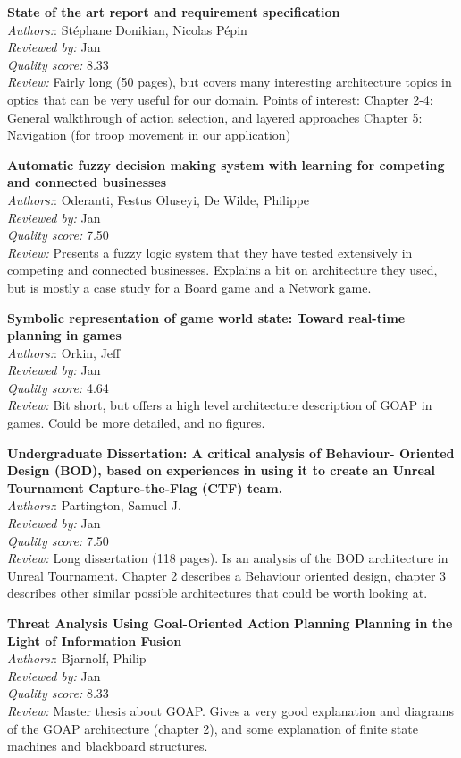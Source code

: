 \textbf{State of the art report and requirement specification}\\
\textit{Authors:}: Stéphane Donikian, Nicolas Pépin\\
\textit{Reviewed by:} Jan\\
\textit{Quality score:} 8.33\\
\textit{Review:} Fairly long (50 pages), but covers many interesting architecture topics in optics that can be very useful for our domain. Points of interest:
Chapter 2-4: General walkthrough of action selection, and layered approaches
Chapter 5: Navigation (for troop movement in our application)

\textbf{Automatic fuzzy decision making system with learning for competing and connected businesses}\\
\textit{Authors:}: Oderanti, Festus Oluseyi, De Wilde, Philippe\\
\textit{Reviewed by:} Jan\\
\textit{Quality score:} 7.50\\
\textit{Review:} Presents a fuzzy logic system that they have tested extensively in competing and connected businesses. Explains a bit on architecture they used, but is mostly a case study for a Board game and a Network game.

\textbf{Symbolic representation of game world state: Toward real-time planning in games}\\
\textit{Authors:}: Orkin, Jeff\\
\textit{Reviewed by:} Jan\\
\textit{Quality score:} 4.64\\
\textit{Review:} Bit short, but offers a high level architecture description of GOAP in games. Could be more detailed, and no figures. 

\textbf{Undergraduate Dissertation: A critical analysis of Behaviour- Oriented Design (BOD), based on experiences in using it to create an Unreal Tournament Capture-the-Flag (CTF) team.}\\
\textit{Authors:}: Partington, Samuel J.\\
\textit{Reviewed by:} Jan\\
\textit{Quality score:} 7.50\\
\textit{Review:} Long dissertation (118 pages). Is an analysis of the BOD architecture in Unreal Tournament. Chapter 2 describes a Behaviour oriented design, chapter 3 describes other similar possible architectures that could be worth looking at.

\textbf{Threat Analysis Using Goal-Oriented Action Planning Planning in the Light of Information Fusion}\\
\textit{Authors:}: Bjarnolf, Philip\\
\textit{Reviewed by:} Jan\\
\textit{Quality score:} 8.33\\
\textit{Review:} Master thesis about GOAP. Gives a very good explanation and diagrams of the GOAP architecture (chapter 2), and some explanation of finite state machines and blackboard structures. 

